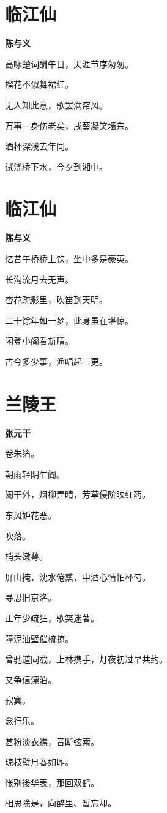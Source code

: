 \documentclass[12pt,a4paper]{ctexbook}
\begin{document}
\section{临江仙}
\textbf{陈与义}\par\vspace{0.5em}
高咏楚词酬午日，天涯节序匆匆。\par
榴花不似舞裙红。\par
无人知此意，歌罢满帘风。\par
万事一身伤老矣，戌葵凝笑墙东。\par
酒杯深浅去年同。\par
试浇桥下水，今夕到湘中。\par

\section{临江仙}
\textbf{陈与义}\par\vspace{0.5em}
忆昔午桥桥上饮，坐中多是豪英。\par
长沟流月去无声。\par
杏花疏影里，吹笛到天明。\par
二十馀年如一梦，此身虽在堪惊。\par
闲登小阁看新晴。\par
古今多少事，渔唱起三更。\par

\section{兰陵王}
\textbf{张元干}\par\vspace{0.5em}
卷朱箔。\par
朝雨轻阴乍阁。\par
阑干外，烟柳弄晴，芳草侵阶映红药。\par
东风妒花恶。\par
吹落。\par
梢头嫩萼。\par
屏山掩，沈水倦熏，中酒心情怕杯勺。\par
寻思旧京洛。\par
正年少疏狂，歌笑迷著。\par
障泥油壁催梳掠。\par
曾驰道同载，上林携手，灯夜初过早共约。\par
又争信漂泊。\par
寂寞。\par
念行乐。\par
甚粉淡衣襟，音断弦索。\par
琼枝璧月春如昨。\par
怅别後华表，那回双鹤。\par
相思除是，向醉里、暂忘却。\par
\end{document}
